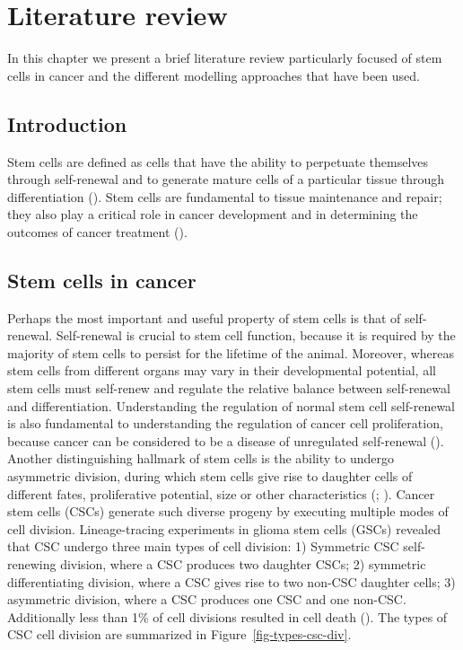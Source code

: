 \documentclass[
  letterpaper,
]{scrreprt}
\theoremstyle{definition}
\theoremstyle{remark}
\begin{document}

\chapter{Literature review}\label{sec-lit-review}

In this chapter we present a brief literature review particularly
focused of stem cells in cancer and the different modelling approaches
that have been used.

\section{Introduction}\label{sec-introduction-lit}

Stem cells are defined as cells that have the ability to perpetuate
themselves through self-renewal and to generate mature cells of a
particular tissue through differentiation (). Stem cells are fundamental to tissue maintenance and
repair; they also play a critical role in cancer development and in
determining the outcomes of cancer treatment
().

\section{Stem cells in cancer}\label{sec-stem-cells-in-cancer}

Perhaps the most important and useful property of stem cells is that of
self-renewal. Self-renewal is crucial to stem cell function, because it
is required by the majority of stem cells to persist for the lifetime of
the animal. Moreover, whereas stem cells from different organs may vary
in their developmental potential, all stem cells must self-renew and
regulate the relative balance between self-renewal and differentiation.
Understanding the regulation of normal stem cell self-renewal is also
fundamental to understanding the regulation of cancer cell
proliferation, because cancer can be considered to be a disease of
unregulated self-renewal ().
Another distinguishing hallmark of stem cells is the ability to undergo
asymmetric division, during which stem cells give rise to daughter cells
of different fates, proliferative potential, size or other
characteristics (;
). Cancer stem cells
(CSCs) generate such diverse progeny by executing multiple modes of cell
division. Lineage-tracing experiments in glioma stem cells (GSCs)
revealed that CSC undergo three main types of cell division: 1)
Symmetric CSC self-renewing division, where a CSC produces two daughter
CSCs; 2) symmetric differentiating division, where a CSC gives rise to
two non-CSC daughter cells; 3) asymmetric division, where a CSC produces
one CSC and one non-CSC. Additionally less than 1\% of cell divisions
resulted in cell death ().
The types of CSC cell division are summarized in
Figure~\ref{fig-types-csc-div}.
\end{document}
